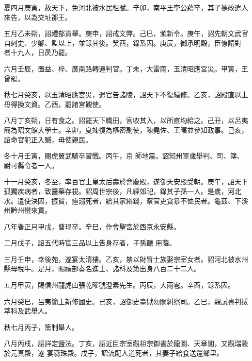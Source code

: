 \begin{pinyinscope}
 夏四月庚寅，赦天下，免河北被水民租賦。辛卯，南平王李公蘊卒，其子德政遣人來告，以為交址郡王。



 五月乙未朔，詔禮部貢舉。庚申，詔戒文弊。己巳，頒新令。庚午，詔先朝文武官自刺史、少卿、監以上，並錄其後。癸酉，錄系囚。庚辰，御承明殿，臣僚請對
 者十九人，日昃乃罷。



 六月壬辰，置益、梓、廣南路轉運判官。丁未，大雷雨，玉清昭應宮災。甲寅，王曾罷。



 秋七月癸亥，以玉清昭應宮災，遣官告諸陵，詔天下不復繕修。乙亥，詔殿直以上毋得換文資。乙酉，罷諸宮觀使。



 八月丁亥朔，日有食之。詔罷天下職田，官收其入，以所直均給之。己丑，以呂夷簡為昭文館大學士。辛卯，夏竦復為樞密副使，陳堯佐、王曙並參知政事。己亥，詔命官犯正入贓，毋使親民。



 冬十月壬寅，閱虎翼武騎卒習戰。丙午，京
 師地震。詔知州軍歲舉判、司、簿、尉可縣令者一人。



 十一月癸亥，冬至，率百官上皇太后壽於會慶殿，遂御天安殿受朝。庚午，詔天下孤獨疾病者，致醫藥存視。詔周世宗後，凡經郊祀，錄其子孫一人。是歲，河北水。遣使決囚，振貧，瘞溺死者，給其家緡錢，察官吏貪暴不恤民者。龜茲、下溪州黔州蠻來貢。



 八年春正月甲戌，曹瑋卒。辛巳，作會聖宮於西京永安縣。



 二月戊子，詔五代時官三品以上告身存者，子孫聽
 用蔭。



 三月壬申，幸後苑，遂宴太清樓。乙亥，禁以財冒士族娶宗室女者。詔河北被水州縣毋稅牛。是月，賜禮部奏名進士、諸科及第出身八百二十二人。



 五月甲寅，賜信州龍虎山張乾曜號澄素先生。丙辰，大雨雹。辛酉，錄系囚。



 六月癸巳，呂夷簡上新修國史。己亥，詔御史臺獄勿關糾察司。乙巳，親試書判拔萃科及武舉人。



 秋七月丙子，策制舉人。



 八月丙戌，詔詳定鹽法。丁亥，詔近臣宗室觀祖宗御書於龍圖、天章閣，又觀瑞穀於元真殿，遂
 宴蕊珠殿。戊子，詔流配人道死者，其妻子給食送還鄉里。




\end{pinyinscope}
